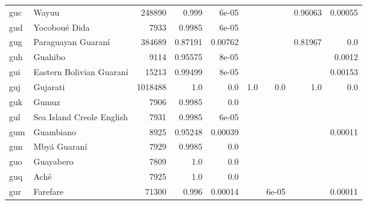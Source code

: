 \documentclass[11pt]{article}
\begin{document}
\begin{table*}[h]
{\begin{tabular}{llrrrrrrr}
guc         & Wayuu         & 248890         & 0.999         & 6e-05         &          &          & 0.96063         & 0.00055         \\

gud         & Yocoboué Dida         & 7933         & 0.9985         & 6e-05         &          &          &          &          \\

gug         & Paraguayan Guaraní         & 384689         & 0.87191         & 0.00762         &          &          & 0.81967         & 0.0         \\

guh         & Guahibo         & 9114         & 0.95575         & 8e-05         &          &          &          & 0.0012         \\

gui         & Eastern Bolivian Guaraní         & 15213         & 0.99499         & 8e-05         &          &          &          & 0.00153         \\

guj         & Gujarati         & 1018488         & 1.0         & 0.0         & 1.0         & 0.0         & 1.0         & 0.0         \\

guk         & Gumuz         & 7906         & 0.9985         & 0.0         &          &          &          &          \\

gul         & Sea Island Creole English         & 7931         & 0.9985         & 6e-05         &          &          &          &          \\

gum         & Guambiano         & 8925         & 0.95248         & 0.00039         &          &          &          & 0.00011         \\

gun         & Mbyá Guaraní         & 7929         & 0.9985         & 0.0         &          &          &          &          \\

guo         & Guayabero         & 7809         & 1.0         & 0.0         &          &          &          &          \\

guq         & Aché         & 7925         & 1.0         & 0.0         &          &          &          &          \\

gur         & Farefare         & 71300         & 0.996         & 0.00014         &          & 6e-05         &          & 0.00011         \\


\end{tabular}}
\end{table*}
\end{document}
